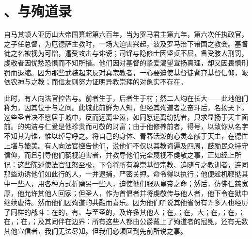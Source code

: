 
\chapter{、与殉道录}


\par

自马其顿人亚历山大帝国算起第六百年，当为罗马君主第九年，第六次任执政官，之子任总督，为厄德萨主教时，一场大迫害兴起，波及罗马治下诸国之教会。基督徒之名被视为可憎，遭受攻击与诽谤；司铎与隐修士因坚贞不屈，备受骇人刑罚，虔敬者因忧愁恐惧而不知所措。他们因对基督的挚爱渴望宣扬真理，却又因畏惧刑罚而退缩。因为那些武装起来反对真宗教者，一心要迫使基督徒背弃基督信仰，皈依农神与之教；而信友则努力证明异教崇拜的对象实不存在。\par

此时，有人向法官控告与。前者生于，后者生于村；然二人均在长大——此地他们称为，因其位于与之间。此城此前鲜为人知，但经其殉道者之奋斗后，名扬天下。这些圣者决不愿居于城中，反而远离尘嚣，如同愿远离纷扰者，只求显扬于天主面前。的纯洁与仁爱是他珍贵而可敬的财富；由于他修养前者，得号，以致你从名字不知其为谁，惟以绰号呼之。将自己的身体、青春活泼的心灵奉献于天主，在德性上堪与媲美。有人向法官控告他们，说他们不仅以其教诲遍及四周，鼓励民众持守信仰，而且引导他们藐视迫害者，并教导他们完全蔑视不虔敬之事，正如经上所记：这些陈述使法官狂怒至极，下令将所有尊崇基督宗教、追随与之教训者，连同那些劝诱他们如此行的人，一并逮捕，严密关押。命令得以执行；他便趁机鞭挞其中一些人，用各种方式折磨另一些人，迫使他们服从皇帝之命；然后，仿佛仁慈宽厚，他允许其他人回家；但圣人，作为首倡者并将虔敬传与他人者，他下令在狱中继续虐待。然而他们因殉道的共融而喜乐。因为他们听说其他省份有许多人也经历了同样的战斗：在的，有、与至圣的，及许多其他人；在，；在，大；在，；在，；在，；在，；及其同伴在边界：所有这些人都由公爵戴上了殉道者的冠冕，还有无数其他宣信者，我们无法尽知。但我们必须回到先前所说之事。\par

